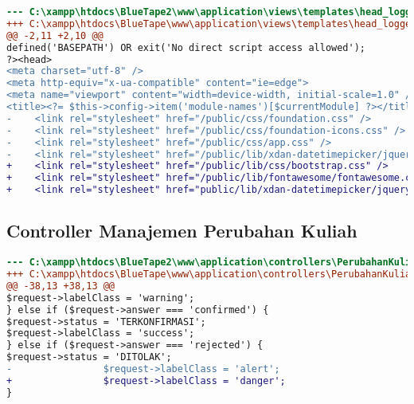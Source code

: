 \begin{lstlisting}[language=diff, caption=Penambahan library csss, label=Entri, basicstyle=\ttfamily, frame=single,
columns=fullflexible, keepspaces=true, breaklines=true]
--- C:\xampp\htdocs\BlueTape2\www\application\views\templates\head_loggedin.php
+++ C:\xampp\htdocs\BlueTape\www\application\views\templates\head_loggedin.php
@@ -2,11 +2,10 @@
defined('BASEPATH') OR exit('No direct script access allowed');
?><head>
<meta charset="utf-8" />
<meta http-equiv="x-ua-compatible" content="ie=edge">
<meta name="viewport" content="width=device-width, initial-scale=1.0" />
<title><?= $this->config->item('module-names')[$currentModule] ?></title>
-    <link rel="stylesheet" href="/public/css/foundation.css" />
-    <link rel="stylesheet" href="/public/css/foundation-icons.css" />
-    <link rel="stylesheet" href="/public/css/app.css" />
-    <link rel="stylesheet" href="/public/lib/xdan-datetimepicker/jquery.datetimepicker.min.css" />
+    <link rel="stylesheet" href="/public/lib/css/bootstrap.css" />
+    <link rel="stylesheet" href="/public/lib/fontawesome/fontawesome.css">
+    <link rel="stylesheet" href="public/lib/xdan-datetimepicker/jquery.datetimepicker.min.css">
\end{lstlisting}

\subsection{Controller Manajemen Perubahan Kuliah}
\begin{lstlisting}[language=diff, caption=Controller PerubahanKuliahManage, label=Entri, basicstyle=\ttfamily, frame=single,
columns=fullflexible, keepspaces=true, breaklines=true]
--- C:\xampp\htdocs\BlueTape2\www\application\controllers\PerubahanKuliahManage.php	
+++ C:\xampp\htdocs\BlueTape\www\application\controllers\PerubahanKuliahManage.php	
@@ -38,13 +38,13 @@
$request->labelClass = 'warning';
} else if ($request->answer === 'confirmed') {
$request->status = 'TERKONFIRMASI';
$request->labelClass = 'success';
} else if ($request->answer === 'rejected') {
$request->status = 'DITOLAK';
-                $request->labelClass = 'alert';
+                $request->labelClass = 'danger';
}
\end{lstlisting}  

